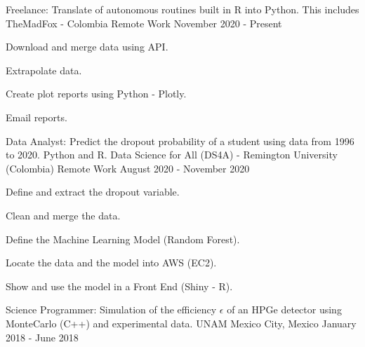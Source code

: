 \begin{cventries}
  \cventry
    {Freelance: Translate of autonomous routines built in R into Python. This includes} %
    {TheMadFox - Colombia} %
    {Remote Work} %
    {November 2020 - Present} %
    {
      \begin{cvitems} %
\item {Download and merge data using API.}
\item {Extrapolate data.}
\item {Create plot reports using Python - Plotly. }
\item {Email reports.}
      \end{cvitems}
    }
  \cventry
  	{Data Analyst: Predict the dropout probability of a student using data from 1996 to 2020. Python and R. }%
    {Data Science for All (DS4A) - Remington University (Colombia)} %
    {Remote Work} %
    {August 2020 - November 2020} %
    {
      \begin{cvitems} %
\item {Define and extract the dropout variable.}
\item {Clean and merge the data.}
\item {Define the Machine Learning Model (Random Forest).}
\item {Locate the data and the model into AWS (EC2).}
\item {Show and use the model in a Front End (Shiny - R).}
      \end{cvitems}
    }
  \cventry
  	{Science Programmer: Simulation of the efficiency $\epsilon$ of an HPGe detector using MonteCarlo (C++) and experimental data.}%
    {UNAM} %
    {Mexico City, Mexico} %
    {January 2018 - June 2018} %
    {}
\end{cventries}
